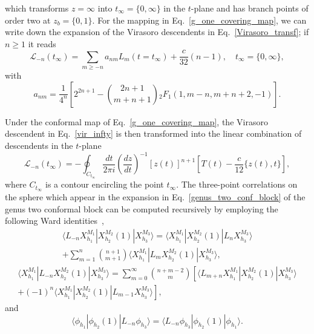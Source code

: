 \documentclass[a4paper,11pt]{article}
\begin{document}
which transforms $z=\infty$ into $t_{\infty}=\{0,\infty\}$
in the $t$-plane and has branch points of order two at $z_b=\{0,1\}$.  For the mapping in Eq.~\eqref{g_one_covering_map}, 
we can write down  the expansion of the Virasoro descendents in Eq.~\eqref{Virasoro_transf};
if $n\geq 1$ it reads
\begin{equation}
\label{g1_1}
 \mathcal{L}_{-n}(t_{\infty})=\sum_{m\geq -n} a_{nm} L_{m}(t=t_{\infty})+\frac{c}{32}(n-1), \quad t_{\infty}=\{0,\infty\},
\end{equation}
with
\begin{equation}
\label{g1_2}
 a_{nm}=\frac{1}{4^n}\left[2^{2n+1}-\binom{2n+1}{m+n+1}{}_2F_1(1, m-n, m+n+2, -1)\right].
\end{equation}

Under the conformal map of
Eq.~\eqref{g_one_covering_map}, the Virasoro descendent in Eq.~\eqref{vir_infty}
is then transformed into the linear combination of descendents in the $t$-plane
\begin{equation}\label{Virasoro_transf}
 \mathcal{L}_{-n}(t_{\infty})=-\oint_{C_{t_{\infty}}}\frac{dt}{2\pi i}
 \left(\frac{dz}{dt}\right)^{-1}[z(t)]^{n+1}
 \left[T(t)-\frac{c}{12}\{z(t), t\}\right],
\end{equation}
where $C_{t_{\infty}}$ is a contour encircling the point $t_{\infty}$.
The three-point correlations on the sphere which appear 
in the expansion in Eq.~\eqref{genus_two_conf_block} of the genus two conformal block can be 
computed recursively by employing the following Ward identities~\cite{Teschner},
\begin{multline}
 \langle L_{-n}X_{h_1}^{M_1}|X_{h_2}^{M_2}(1)|X_{h_3}^{M_3}\rangle=
 \langle X_{h_1}^{M_1}|X_{h_2}^{M_2}(1)|L_n X_{h_3}^{M_3}\rangle \\
 +\sum_{m= 1}^n \binom{n+1}{m+1}\langle X_{h_1}^{M_1}|L_m X_{h_2}^{M_2}(1)|X_{h_3}^{M_3}\rangle,
\end{multline}
\begin{multline}
 \langle X_{h_1}^{M_1}|L_{-n}X_{h_2}^{M_2}(1)|X_{h_3}^{M_3}\rangle=
 \sum_{m=0}^\infty\binom{n+m-2}{m}
 \left[\langle L_{m+n} X_{h_1}^{M_1}|X_{h_2}^{M_2}(1)|X_{h_3}^{M_3}\rangle \right.\\ +
 \left. (-1)^n\langle X_{h_1}^{M_1}|X_{h_2}^{M_2}(1)|L_{m-1} X_{h_3}^{M_3}\rangle\right],
\end{multline}
and
\begin{equation}
 \langle \phi_{h_1}|\phi_{h_2}(1)|L_{-n}\phi_{h_3}\rangle=
 \langle L_{-n}\phi_{h_3}|\phi_{h_2}(1)|\phi_{h_1}\rangle.
\end{equation}
\end{document}
